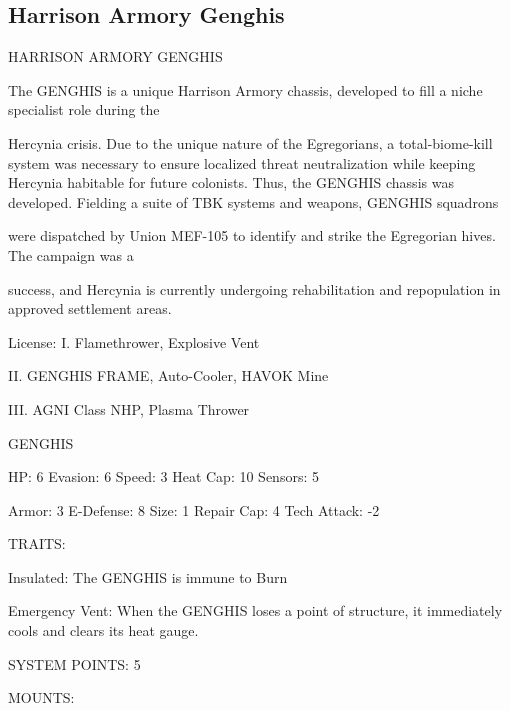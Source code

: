 \subsection{Harrison Armory Genghis}
                                                              
                                  HARRISON ARMORY GENGHIS  

The GENGHIS is a unique Harrison Armory chassis, developed to fill a niche specialist role during the  

Hercynia crisis. Due to the unique nature of the Egregorians, a total-biome-kill system was necessary to  
ensure localized threat neutralization while keeping Hercynia habitable for future colonists. Thus, the  
GENGHIS chassis was developed. Fielding a suite of TBK systems and weapons, GENGHIS squadrons  

were dispatched by Union MEF-105 to identify and strike the Egregorian hives. The campaign was a  

success, and Hercynia is currently undergoing rehabilitation and repopulation in approved settlement areas.    

                                                       License:   
I. Flamethrower, Explosive Vent
 
II. GENGHIS FRAME, Auto-Cooler, HAVOK Mine
 
III. AGNI Class NHP, Plasma Thrower
 

                                                                                                                    


                                                GENGHIS 

HP: 6          Evasion: 6                            Speed: 3            Heat Cap: 10       Sensors: 5 

Armor: 3       E-Defense: 8                          Size: 1             Repair Cap: 4      Tech Attack: -2 

                                                  TRAITS: 

Insulated: The GENGHIS is immune to Burn
 
Emergency Vent: When the GENGHIS loses a point of structure, it immediately cools and clears its  
heat gauge. 

                                            SYSTEM POINTS: 5 

                                                 MOUNTS: 

